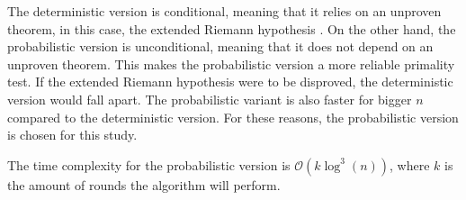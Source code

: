 \documentclass[main.tex]{subfiles}
\begin{document}
The deterministic version is conditional, meaning that it relies on an unproven
theorem, in this case, the extended Riemann hypothesis \cite{riemann}. On the
other hand, the probabilistic version is unconditional, meaning that it does not
depend on an unproven theorem. This makes the probabilistic version a more
reliable primality test. If the extended Riemann hypothesis were to be
disproved, the deterministic version would fall apart. The probabilistic variant
is also faster for bigger $n$ compared to the deterministic version. For these
reasons, the probabilistic version is chosen for this study. \newline

The time complexity for the probabilistic version is $\mathcal{O}(k
\log^{3}(n))$, where $k$ is the amount of rounds the algorithm will perform.
\end{document}
